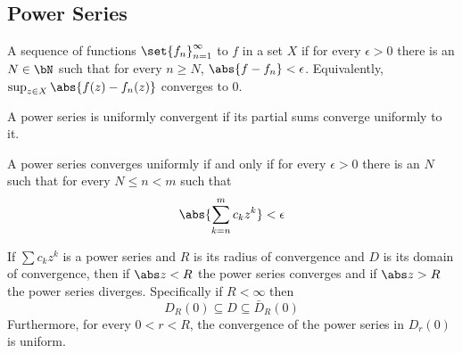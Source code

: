 \documentclass[10pt]{article}
\begin{document}


\bigskip

\subsection{Power Series}

\begin{defn*}

    A sequence of functions $\set{f_n}_{n=1}^\infty$  to $f$ in a set $X$ if for every $\epsilon>0$ there is an $N\in\bN$ such that for every $n\geq N$, $\abs{f-f_n}<\epsilon$.
    Equivalently, $\sup_{z\in X}\abs{f(z)-f_n(z)}$ converges to $0$.

    A power series is uniformly convergent if its partial sums converge uniformly to it.

\end{defn*}

\begin{prop*}

    A power series converges uniformly if and only if for every $\epsilon>0$ there is an $N$ such that for every $N\leq n<m$ such that
    \[ \abs{\sum_{k=n}^m c_kz^k} < \epsilon \]

\end{prop*}

\begin{thrm*}

    If $\sum c_kz^k$ is a power series and $R$ is its radius of convergence and $D$ is its domain of convergence, then if $\abs z<R$ the power series converges and if $\abs z>R$ the power series diverges.
    Specifically if $R<\infty$ then
    \[ D_R(0) \subseteq D \subseteq \bar D_R(0) \]
    Furthermore, for every $0<r<R$, the convergence of the power series in $D_r(0)$ is uniform.

\end{thrm*}
\end{document}
